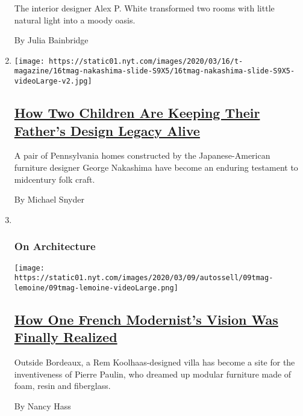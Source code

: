 \begin{enumerate}
  The interior designer Alex P. White transformed two rooms with little
  natural light into a moody oasis.

  By Julia Bainbridge
\item
  \texttt{[image: https://static01.nyt.com/images/2020/03/16/t-magazine/16tmag-nakashima-slide-S9X5/16tmag-nakashima-slide-S9X5-videoLarge-v2.jpg]}

  \hypertarget{how-two-children-are-keeping-their-fathers-design-legacy-alive}{%
  \subsection{\texorpdfstring{\href{/2020/03/16/t-magazine/george-nakashima-legacy.html}{How
  Two Children Are Keeping Their Father's Design Legacy
  Alive}}{How Two Children Are Keeping Their Father's Design Legacy Alive}}\label{how-two-children-are-keeping-their-fathers-design-legacy-alive}}

  A pair of Pennsylvania homes constructed by the Japanese-American
  furniture designer George Nakashima have become an enduring testament
  to midcentury folk craft.

  By Michael Snyder
\item ~
  \hypertarget{on-architecture}{%
  \subsubsection{On Architecture}\label{on-architecture}}

  \texttt{[image: https://static01.nyt.com/images/2020/03/09/autossell/09tmag-lemoine/09tmag-lemoine-videoLarge.png]}

  \hypertarget{how-one-french-modernists-vision-was-finally-realized}{%
  \subsection{\texorpdfstring{\href{/2020/03/11/t-magazine/rem-koolhaas-pierre-paulin.html}{How
  One French Modernist's Vision Was Finally
  Realized}}{How One French Modernist's Vision Was Finally Realized}}\label{how-one-french-modernists-vision-was-finally-realized}}

  Outside Bordeaux, a Rem Koolhaas-designed villa has become a site for
  the inventiveness of Pierre Paulin, who dreamed up modular furniture
  made of foam, resin and fiberglass.

  By Nancy Hass
\end{enumerate}

